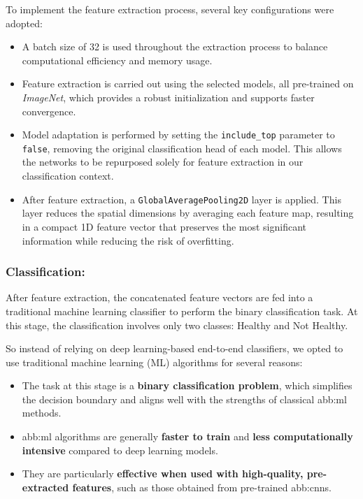 To implement the feature extraction process, several key configurations were adopted:
\begin{itemize}
    \item A batch size of 32 is used throughout the extraction process to balance computational efficiency and memory usage.


    \item Feature extraction is carried out using the selected models, all pre-trained on \textit{ImageNet}, which provides a robust initialization and supports faster convergence.

    \item Model adaptation is performed by setting the \texttt{include\_top} parameter to \texttt{false}, removing the original classification head of each model. This allows the networks to be repurposed solely for feature extraction in our classification context.

    \item After feature extraction, a \texttt{GlobalAveragePooling2D} layer is applied. This layer reduces the spatial dimensions by averaging each feature map, resulting in a compact 1D feature vector that preserves the most significant information while reducing the risk of overfitting.

\end{itemize}
\vspace{0.3cm}
\subsubsection{Classification:} 
After feature extraction, the concatenated feature vectors are fed into a traditional machine learning classifier to perform the binary classification task. At this stage, the classification involves only two classes: Healthy and Not Healthy.

So instead of relying on deep learning-based end-to-end classifiers, we opted to use traditional machine learning (ML) algorithms for several reasons:
\begin{itemize}
    \item The task at this stage is a \textbf{binary classification problem}, which simplifies the decision boundary and aligns well with the strengths of classical \gls{abb:ml} methods.
    
    \item \gls{abb:ml} algorithms are generally \textbf{faster to train} and \textbf{less computationally intensive} compared to deep learning models.
    
    \item They are particularly \textbf{effective when used with high-quality, pre-extracted features}, such as those obtained from pre-trained \gls{abb:cnn}s.
\end{itemize}

